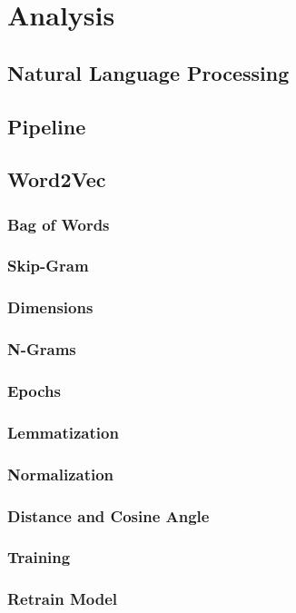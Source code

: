 \chapter{Analysis}
\label{chap:analysis}
\section{Natural Language Processing}
\section{Pipeline}
\section{Word2Vec}
\subsection{Bag of Words}
\label{sec:cbow}
\subsection{Skip-Gram}
\label{sec:skip-gram}
\subsection{Dimensions}
\subsection{N-Grams}
\subsection{Epochs}
\subsection{Lemmatization}
\subsection{Normalization}
\subsection{Distance and Cosine Angle}
\subsection{Training}
\subsection{Retrain Model}
